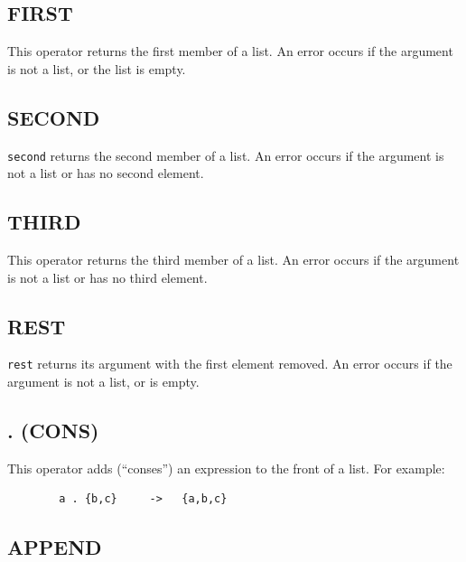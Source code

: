 \subsection{FIRST}
\hypertarget{operator:FIRST}{}

This operator returns the first member of a list.  An error
occurs if the argument is not a list, or the list is empty.

\subsection{SECOND}
\hypertarget{operator:SECOND}{}

\texttt{second} returns the second member of a list.  An error
occurs if the argument is not a list or has no second element.

\subsection{THIRD}
\hypertarget{operator:THIRD}{}

This operator returns the third member of a list.  An error
occurs if the argument is not a list or has no third element.

\subsection{REST}
\hypertarget{operator:REST}{}

\texttt{rest} returns its argument with the first element
removed.  An error occurs if the argument is not a list, or is empty.

\subsection{\textbf{.} (CONS)}
\hypertarget{operator:CONS}{}
\hypertarget{reserved:consop}{}

This operator adds (``conses'') an expression to the
front of a list.  For example:
\begin{verbatim}
        a . {b,c}     ->   {a,b,c}
\end{verbatim}

\subsection{APPEND}
\hypertarget{operator:APPEND}{}

